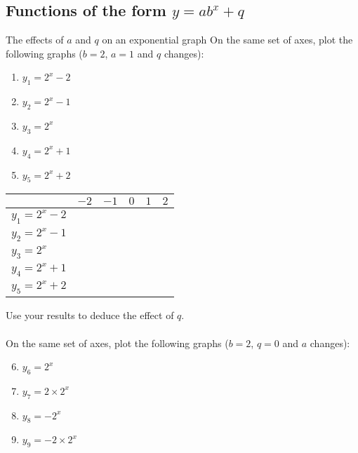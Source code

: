    

\subsection*{Functions of the form $y=ab^{x}+q$}
\begin{Investigation}{The effects of $a$ and $q$ on an exponential graph}
On the same set of axes, plot the following graphs ($b=2$, $a=1$ and $q$ changes):
\begin{enumerate}[noitemsep, label=\textbf{\arabic*}. ] 
\item $y_1=2^{x}-2$
\item $y_2=2^{x}-1$
\item $y_3=2^{x}$
\item $y_4=2^{x}+1$
\item $y_5=2^{x}+2$
\end{enumerate}

\begin{table}[H]
\begin{center}
\begin{tabular}{|l|c|c|c|c|c|}
\hline
   &  $-2$ & $-1$ & $0$ & $1$ & $2$ 
\\ \hline
$y_1=2^{x}-2$& \hspace{1cm} & \hspace{1cm} & \hspace{1cm} & \hspace{1cm} & \hspace{1cm}
\\ \hline
 $y_2=2^{x}-1$&  &&&&
\\ \hline
$y_3=2^{x}$&  &&&&
\\ \hline
$y_4=2^{x}+1$&  &&&&
\\ \hline
$y_5=2^{x}+2$&  &&&&
\\ \hline
\end{tabular}
\end{center}
\end{table}
Use your results to deduce the effect of $q$.
\\
\\
On the same set of axes, plot the following graphs ($b=2$, $q=0$ and $a$ changes):
\begin{enumerate}[noitemsep, label=\textbf{\arabic*}. ] 
\setcounter{enumi}{5}
\item $y_6=2^{x}$
\item $y_7=2 \times 2^{x}$
\item $y_8=-2^{x}$
\item $y_9=-2 \times 2^{x}$
\end{enumerate}


\end{Investigation}
